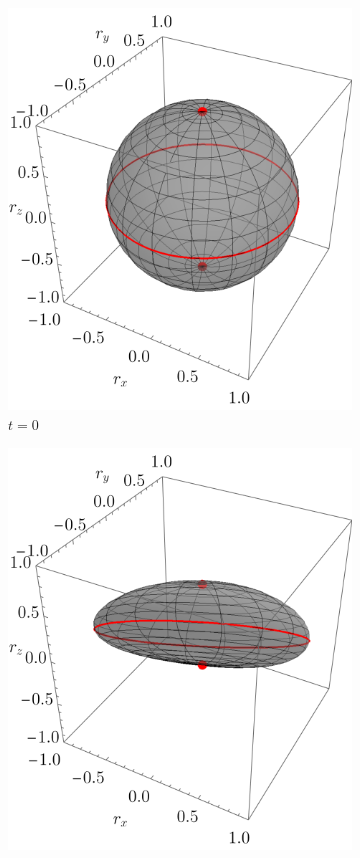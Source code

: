   \begin{figure}[ht!]
  \centering
  \begin{subfigure}{0.32\textwidth}
    \centering
    \includegraphics[width=0.9\linewidth]{chapter4/figures_toy/CNOT_p=0.5_t=0._r=0.9.png}
    \caption{$t=0$}
  \end{subfigure}%
  \begin{subfigure}{0.32\textwidth}
    \centering
    \includegraphics[width=0.9\linewidth]{chapter4/figures_toy/CNOT_p=0.1_t=0.5_r=0.9.png}

\end{subfigure}
\end{figure}
